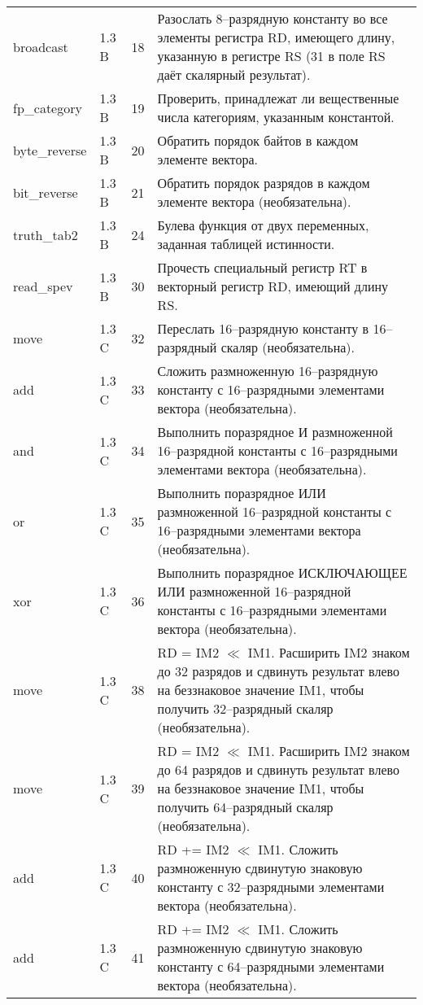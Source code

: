 \documentclass[forwardcom.tex]{subfiles}
\begin{document}
\begin{longtable}{|p{25mm}|p{16mm}|p{9mm}|p{99mm}|}
broadcast        & 1.3 B & 18 & Разослать 8--разрядную константу во все элементы регистра RD, имеющего длину, указанную в регистре RS (31 в поле RS даёт скалярный результат). \\
fp\_category     & 1.3 B & 19 & Проверить, принадлежат ли вещественные числа категориям, указанным  константой. \\
byte\_reverse    & 1.3 B & 20 & Обратить порядок байтов в каждом элементе вектора. \\
bit\_reverse     & 1.3 B & 21 & Обратить порядок разрядов в каждом элементе вектора (необязательна). \\
truth\_tab2      & 1.3 B & 24 & Булева функция от двух переменных, заданная таблицей истинности. \\
read\_spev       & 1.3 B & 30 & Прочесть специальный регистр RT в векторный регистр RD, имеющий длину RS. \\
move             & 1.3 C & 32 & Переслать 16--разрядную константу в 16--разрядный скаляр (необязательна). \\
add              & 1.3 C & 33 & Сложить размноженную 16--разрядную константу с 16--разрядными элементами вектора (необязательна). \\
and              & 1.3 C & 34 & Выполнить поразрядное И размноженной 16--разрядной константы с 16--разрядными элементами вектора (необязательна). \\
or               & 1.3 C & 35 & Выполнить поразрядное ИЛИ размноженной 16--разрядной константы с 16--разрядными элементами вектора (необязательна).  \\
xor              & 1.3 C & 36 & Выполнить поразрядное ИСКЛЮЧАЮЩЕЕ ИЛИ размноженной 16--разрядной константы с 16--разрядными элементами вектора (необязательна). \\
move             & 1.3 C & 38 & RD = IM2 $\ll$ IM1. Расширить IM2 знаком до 32 разрядов и сдвинуть результат влево на беззнаковое значение IM1, чтобы получить 32--разрядный скаляр (необязательна). \\
move             & 1.3 C & 39 & RD = IM2 $\ll$ IM1. Расширить IM2 знаком до 64 разрядов и сдвинуть результат влево на беззнаковое значение IM1, чтобы получить 64--разрядный скаляр (необязательна). \\
add              & 1.3 C & 40 & RD += IM2 $\ll$ IM1. Сложить размноженную сдвинутую знаковую константу с 32--разрядными элементами вектора (необязательна). \\
add              & 1.3 C & 41 & RD += IM2 $\ll$ IM1. Сложить размноженную сдвинутую знаковую константу с 64--разрядными элементами вектора (необязательна). \\

\end{longtable}
\end{document}
